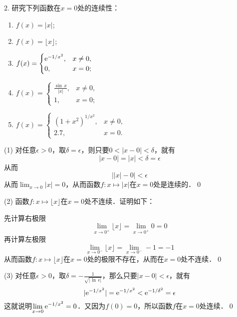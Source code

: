 2. 研究下列函数在$x=0$处的连续性：
\begin{enumerate}
    \item $f(x)=\lvert x \rvert$; 
    \item $f(x)=\lfloor x \rfloor$;
    \item $f(x)=\begin{cases}
       \mathrm{e}^{-1/x^2}, & x \neq 0, \\
       0, & x = 0;
    \end{cases}$ \\
    \item $f(x) = \begin{cases}
        \displaystyle\frac{\sin \, x}{\lvert x \rvert}, & x \neq 0, \\
        1, & x = 0;
    \end{cases}$
    \item $f(x)=\begin{cases}
        (1+x^2)^{1/x^2}, & x \neq 0, \\
        2.7, & x = 0.
    \end{cases}$
\end{enumerate}

(1) \prove 对任意$\epsilon > 0$，取$\delta = \epsilon$，则只要$0 < \lvert x - 0 \rvert < \delta$，就有
\begin{equation}
    \lvert x - 0 \rvert = \lvert x \rvert  < \delta = \epsilon
\end{equation}
从而
\begin{equation}
    \lvert \lvert x \rvert - 0 \rvert < \epsilon
\end{equation}
从而$\displaystyle\lim_{x \to 0} \lvert x \rvert = 0$，从而函数$f: x \mapsto \lvert x \rvert$在$x=0$处是连续的．\qed\bigskip

(2) 函数$f: x \mapsto \lfloor x \rfloor$在$x=0$处不连续．证明如下：\smallskip

\prove 先计算右极限
\begin{equation}
    \lim_{x \to 0^+} \lfloor x \rfloor = \lim_{x \to 0^+} 0 = 0
\end{equation}
再计算左极限
\begin{equation}
    \lim_{x \to 0^-} \lfloor x \rfloor = \lim_{x \to 0^-} -1 = -1
\end{equation}
从而函数$f: x \mapsto \lfloor x \rfloor$在$x=0$处的极限不存在，从而在$x=0$处不连续．\qed\bigskip

(3) \prove 对任意$\epsilon > 0$，取$\delta = - \displaystyle\frac{1}{\sqrt{\lvert \ln \, \epsilon \rvert}}$，那么只要$\lvert x - 0 \rvert < \epsilon$，就有
\begin{equation}
    \lvert \mathrm{e}^{-1/x^2} \rvert = \mathrm{e}^{-1/x^2} < \mathrm{e}^{-1/\delta^2} = \epsilon
\end{equation}
这就说明$\displaystyle\lim_{x \to 0} \mathrm{e}^{-1/x^2} = 0$．又因为$f(0) = 0$，所以函数$f$在$x=0$处连续．\qed\bigskip

